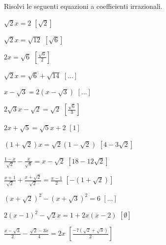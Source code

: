 \begin{esercizio}[\Ast]
 \label{ese:2.80}
Risolvi le seguenti equazioni a coefficienti irrazionali.
 \begin{multicols}{2}
 \begin{enumeratea}
 \item $\sqrt 2x=2$
  \hfill $\left[\sqrt 2 \right]$
 \item $\sqrt 2x=\sqrt{12}$
  \hfill $\left[\sqrt 6\right]$
 \item $2x=\sqrt 6$
  \hfill $\left[\frac{\sqrt{6}}{2}\right]$
 \item $\sqrt 2x=\sqrt 6+\sqrt{14}$
  \hfill $\left[...\right]$
 \item $x-\sqrt 3=2\left(x-\sqrt 3\right)$
  \hfill $\left[...\right]$
 \item $2\sqrt 3x-\sqrt 2=\sqrt 2$
  \hfill $\left[\frac{\sqrt 6} 3\right]$
 \item $2x+\sqrt 5=\sqrt 5x+2$
  \hfill $\left[1\right]$
 \item $(1+\sqrt 2)x=\sqrt 2(1-\sqrt 2)$
  \hfill $\left[4-3\sqrt 2\right]$
 \item $\frac{1-x}{\sqrt 2}-\frac x{\sqrt 8}=x-\sqrt 2$
  \hfill $\left[18-12\sqrt 2\right]$
 \item $\frac{x+1}{\sqrt 2}+\frac{x+\sqrt 2}{\sqrt 2}=\frac{x-1} 2$
  \hfill $\left[-(1+\sqrt 2)\right]$
 \item $(x+\sqrt 2)^2-(x+\sqrt 3)^2=6$
  \hfill $\left[...\right]$
 \item $2(x-1)^2-\sqrt 2x=1+2x(x-2)$
  \hfill $\left[\emptyset\right]$
 \item $\frac{x-\sqrt 3} 2-\frac{\sqrt 2-3x} 4=2x$
  \hfill $\left[\frac{-7(\sqrt 2+\sqrt 3)} 2\right]$
 \end{enumeratea}
 \end{multicols}
\end{esercizio}


